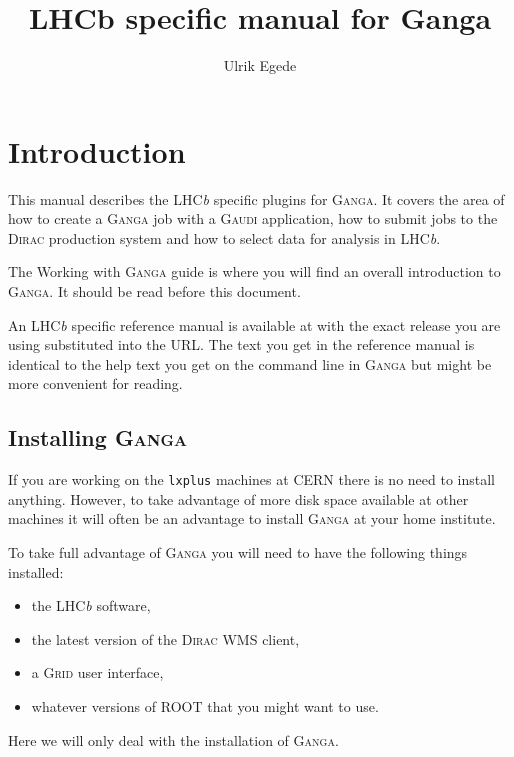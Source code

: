 \documentclass{howto}
\title{LHCb specific manual for Ganga \totalv}
\author{Ulrik Egede}
\def\ganga {\textsc{Ganga}\xspace}
\def\root {\textsc{ROOT}\xspace}
\def\lhcb {LHC{\em b\/}\xspace}
\def\gaudi {\textsc{Gaudi}\xspace}
\def\dirac {\textsc{Dirac}\xspace}
\def\grid {\textsc{Grid}\xspace}
\begin{document}
\maketitle
\tableofcontents

\section{Introduction}
\noindent
This manual describes the \lhcb specific plugins for \ganga. It covers the
area of how to create a \ganga job with a \gaudi application, how to submit
jobs to the \dirac production system and how to select data for analysis in
\lhcb.

\begin{seealso}
  The Working with \ganga guide is where you will find an overall introduction
  to \ganga. It should be read before this document.
\end{seealso}

\begin{seealso}
  An \lhcb specific reference manual is available at 
  with the exact release you are using substituted into the URL. The text you
  get in the reference manual is identical to the help text you get on the
  command line in \ganga but might be more convenient for reading.
\end{seealso}

\subsection{Installing \ganga}
\label{sec:install}
If you are working on the \texttt{lxplus} machines at CERN there is no need to
install anything. However, to take advantage of more disk space available at
other machines it will often be an advantage to install \ganga at your home
institute.

To take full advantage of \ganga you will need to have the following things
installed:
\begin{itemize}
\item the \lhcb software,
\item the latest version of the \dirac WMS client,
\item a \grid user interface,
\item whatever versions of \root that you might want to use.
\end{itemize}
Here we will only deal with the installation of \ganga.
\end{document}
